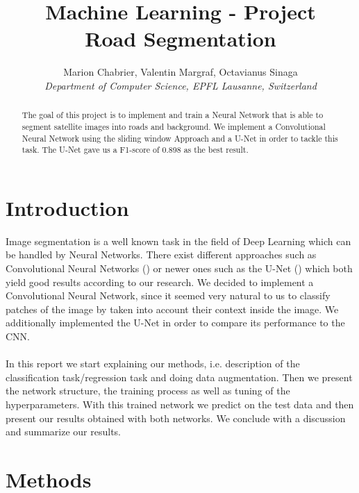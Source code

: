 \documentclass[10pt,conference,compsocconf]{IEEEtran}
\begin{document}
\title{Machine Learning - Project \\ Road Segmentation}

\author{
	Marion Chabrier, Valentin Margraf, Octavianus Sinaga\\
	\textit{Department of Computer Science, EPFL Lausanne, Switzerland}
}

\maketitle

\begin{abstract}
	The goal of this project is to implement and train a Neural Network that is able to segment satellite images into roads and background. We implement a Convolutional Neural Network using the sliding window Approach and a U-Net in order to tackle this task. The U-Net gave us a F1-score of 0.898 as the best result.\end{abstract}

\section{Introduction}
\vspace{0.3cm}
Image segmentation is a well known task in the field of Deep Learning which can be handled by Neural Networks. There exist different approaches such as Convolutional Neural Networks (\cite{pixelwise}) or newer ones such as the U-Net (\cite{unet}) which both yield good results according to our research. We decided to implement a Convolutional Neural Network,  since it seemed very natural to us to classify patches of the image by taken into account their context inside the image. We additionally implemented the U-Net in order to compare its performance to the CNN. 
\\\\In this report we start explaining our methods, i.e. description of the classification task/regression task and doing data augmentation.  Then we present the network structure, the training process as well as tuning of the hyperparameters. With this trained network we predict on the test data and then present our results obtained with both networks. We conclude with a discussion and summarize our results.

\vspace{0.5cm}
\section{Methods}
\vspace{0.3cm}
\end{document}
